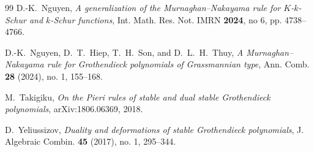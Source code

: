 \documentclass[11pt]{amsart}
\numberwithin{equation}{section}
\theoremstyle{definition}
\theoremstyle{remark}
\begin{document}
\begin{thebibliography}{99}
D.-K.~Nguyen,
\emph{A generalization of the Murnaghan--Nakayama rule for
$K$-$k$-Schur and $k$-Schur functions}, Int. Math. Res. Not. IMRN \textbf{2024}, no 6, pp. 4738–4766.

D.-K.~Nguyen, D.~T.~Hiep, T.~H.~Son, and D.~L.~H.~Thuy,
\emph{A Murnaghan--Nakayama rule for Grothendieck polynomials of
Grassmannian type}, Ann. Comb. \textbf{28} (2024), no. 1, 155--168.

M.~Takigiku,
\emph{On the Pieri rules of stable and dual stable Grothendieck
polynomials}, arXiv:1806.06369, 2018.

D.~Yeliussizov,
\emph{Duality and deformations of stable Grothendieck polynomials},
J. Algebraic Combin. \textbf{45} (2017), no. 1, 295--344.

\end{thebibliography}
\end{document}
